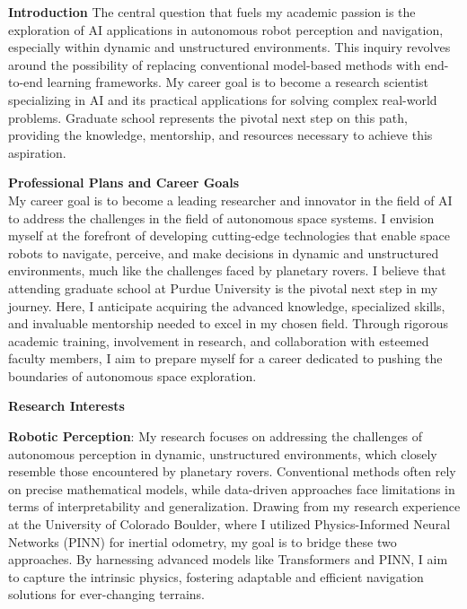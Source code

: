\documentclass[a4,20pt]{article}
\begin{document}
\begin{large} 

\textbf{Introduction} \newline
The central question that fuels my academic passion is the exploration of AI applications in autonomous robot perception and navigation, especially within dynamic and unstructured environments. This inquiry revolves around the possibility of replacing conventional model-based methods with end-to-end learning frameworks. My career goal is to become a research scientist specializing in AI and its practical applications for solving complex real-world problems. Graduate school represents the pivotal next step on this path, providing the knowledge, mentorship, and resources necessary to achieve this aspiration.

\textbf{Professional Plans and Career Goals} \\
My career goal is to become a leading researcher and innovator in the field of AI to address the challenges in the field of autonomous space systems. I envision myself at the forefront of developing cutting-edge technologies that enable space robots to navigate, perceive, and make decisions in dynamic and unstructured environments, much like the challenges faced by planetary rovers. I believe that attending graduate school at Purdue University is the pivotal next step in my journey. Here, I anticipate acquiring the advanced knowledge, specialized skills, and invaluable mentorship needed to excel in my chosen field. Through rigorous academic training, involvement in research, and collaboration with esteemed faculty members, I aim to prepare myself for a career dedicated to pushing the boundaries of autonomous space exploration.

\textbf{Research Interests} \vspace{-0.35cm}

\textbf{Robotic Perception}: My research focuses on addressing the challenges of autonomous perception in dynamic, unstructured environments, which closely resemble those encountered by planetary rovers. Conventional methods often rely on precise mathematical models, while data-driven approaches face limitations in terms of interpretability and generalization. Drawing from my research experience at the University of Colorado Boulder, where I utilized Physics-Informed Neural Networks (PINN) for inertial odometry, my goal is to bridge these two approaches. By harnessing advanced models like Transformers and PINN, I aim to capture the intrinsic physics, fostering adaptable and efficient navigation solutions for ever-changing terrains.\vspace{-0.35cm}


\end{large}
\end{document}
